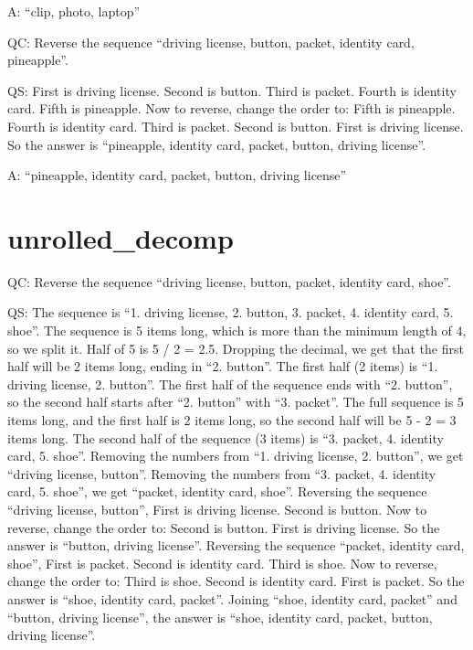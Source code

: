\documentclass[
]{article}
\begin{document}
A: ``clip, photo, laptop''

QC: Reverse the sequence ``driving license, button, packet, identity
card, pineapple''.

QS: First is driving license. Second is button. Third is packet. Fourth
is identity card. Fifth is pineapple. Now to reverse, change the order
to: Fifth is pineapple. Fourth is identity card. Third is packet. Second
is button. First is driving license. So the answer is ``pineapple,
identity card, packet, button, driving license''.

A: ``pineapple, identity card, packet, button, driving license''

\section{unrolled\_decomp}\label{unrolled_decomp}

QC: Reverse the sequence ``driving license, button, packet, identity
card, shoe''.

QS: The sequence is ``1. driving license, 2. button, 3. packet, 4.
identity card, 5. shoe''. The sequence is 5 items long, which is more
than the minimum length of 4, so we split it. Half of 5 is 5 / 2 = 2.5.
Dropping the decimal, we get that the first half will be 2 items long,
ending in ``2. button''. The first half (2 items) is ``1. driving
license, 2. button''. The first half of the sequence ends with ``2.
button'', so the second half starts after ``2. button'' with ``3.
packet''. The full sequence is 5 items long, and the first half is 2
items long, so the second half will be 5 - 2 = 3 items long. The second
half of the sequence (3 items) is ``3. packet, 4. identity card, 5.
shoe''. Removing the numbers from ``1. driving license, 2. button'', we
get ``driving license, button''. Removing the numbers from ``3. packet,
4. identity card, 5. shoe'', we get ``packet, identity card, shoe''.
Reversing the sequence ``driving license, button'', First is driving
license. Second is button. Now to reverse, change the order to: Second
is button. First is driving license. So the answer is ``button, driving
license''. Reversing the sequence ``packet, identity card, shoe'', First
is packet. Second is identity card. Third is shoe. Now to reverse,
change the order to: Third is shoe. Second is identity card. First is
packet. So the answer is ``shoe, identity card, packet''. Joining
``shoe, identity card, packet'' and ``button, driving license'', the
answer is ``shoe, identity card, packet, button, driving license''.
\end{document}
